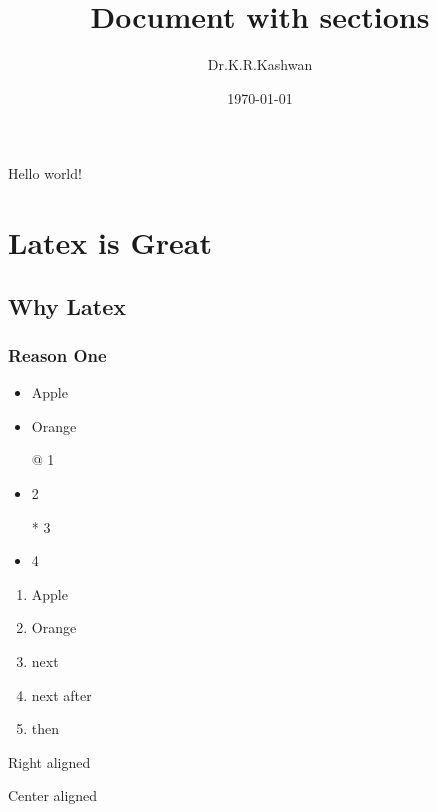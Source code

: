 \documentclass{article}
\title{Document with sections}
\author{Dr.K.R.Kashwan}
\date{\today}
\begin{document}
\maketitle
Hello world!
\section{ Latex is Great}
\subsection{ Why Latex}
\subsubsection{Reason One}
\newpage
\begin{itemize}
	\item Apple
	\item Orange
	\item[@] 1
	\item 2
	\item[*] 3
	\item 4
\end{itemize}
\newpage
\begin{enumerate}
		\item Apple
		\item Orange
		\item next
		\item next after
		\item then
\end{enumerate}
\newpage
\begin{flushright}
Right aligned
\end{flushright}

\begin{center}
Center aligned
\end{center}
\end{document}
